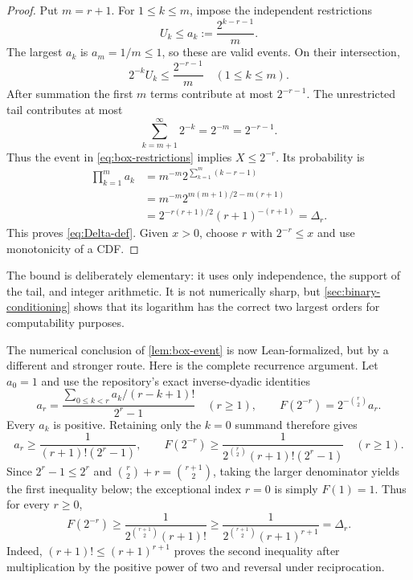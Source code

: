 \documentclass[11pt,oneside]{article}
\theoremstyle{definition}
\theoremstyle{remark}
\numberwithin{equation}{section}
\begin{document}
\begin{proof}
Put $m=r+1$.  For $1\le k\le m$, impose the independent restrictions
\begin{equation}\label{eq:box-restrictions}
 U_k\le a_k:=\frac{2^{k-r-1}}{m}.
\end{equation}
The largest $a_k$ is $a_m=1/m\le1$, so these are valid events.  On their
intersection,
\[
 2^{-k}U_k\le\frac{2^{-r-1}}m
 \quad(1\le k\le m).
\]
After summation the first $m$ terms contribute at most $2^{-r-1}$.  The
unrestricted tail contributes at most
\[
 \sum_{k=m+1}^{\infty}2^{-k}=2^{-m}=2^{-r-1}.
\]
Thus the event in \eqref{eq:box-restrictions} implies $X\le2^{-r}$.  Its
probability is
\begin{align*}
 \prod_{k=1}^{m}a_k
 &=m^{-m}2^{\sum_{k=1}^m(k-r-1)}\\
 &=m^{-m}2^{m(m+1)/2-m(r+1)}\\
 &=2^{-r(r+1)/2}(r+1)^{-(r+1)}=\Delta_r.
\end{align*}
This proves \eqref{eq:Delta-def}.  Given $x>0$, choose $r$ with
$2^{-r}\le x$ and use monotonicity of a CDF.
\end{proof}

The bound is deliberately elementary: it uses only independence, the support
of the tail, and integer arithmetic.  It is not numerically sharp, but
\cref{sec:binary-conditioning} shows that its logarithm has the correct two
largest orders for computability purposes.

The numerical conclusion of \cref{lem:box-event} is now Lean-formalized, but
by a different and stronger route.  Here is the complete recurrence argument.
Let $a_0=1$ and use the repository's exact inverse-dyadic identities
\[
 a_r=
 \frac{\displaystyle\sum_{0\le k<r}a_k/(r-k+1)!}{2^r-1}
 \quad(r\ge1),
 \qquad
 F(2^{-r})=2^{-\binom r2}a_r.
\]
Every $a_k$ is positive.  Retaining only the $k=0$ summand therefore gives
\[
 a_r\ge\frac{1}{(r+1)!(2^r-1)},
 \qquad
 F(2^{-r})\ge
 \frac{1}{2^{\binom r2}(r+1)!(2^r-1)}
 \quad(r\ge1).
\]
Since $2^r-1\le2^r$ and
$\binom r2+r=\binom{r+1}{2}$, taking the larger denominator yields the
first inequality below; the exceptional index $r=0$ is simply $F(1)=1$.
Thus for every $r\ge0$,
\begin{equation}\label{eq:factorial-endpoint-lower}
 F(2^{-r})\ge
 \frac{1}{2^{\binom{r+1}{2}}(r+1)!}
 \ge
 \frac{1}{2^{\binom{r+1}{2}}(r+1)^{r+1}}
 =\Delta_r.
\end{equation}
Indeed, $(r+1)!\le(r+1)^{r+1}$ proves the second inequality after
multiplication by the positive power of two and reversal under reciprocation.
\end{document}
